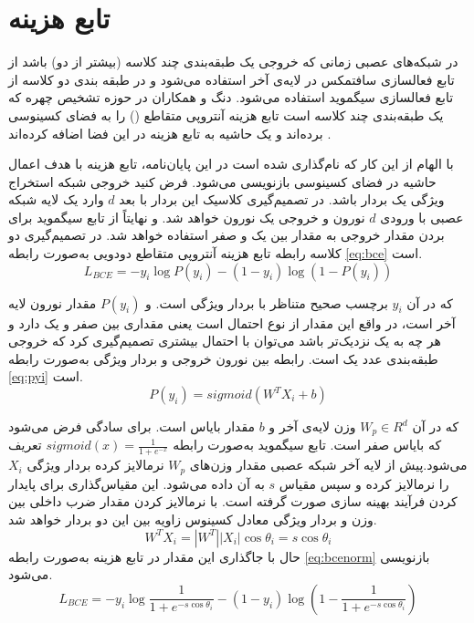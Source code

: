 \section{تابع هزینه }
در شبکه‌های عصبی زمانی که خروجی یک طبقه‌بندی چند کلاسه (بیشتر از دو) باشد از تابع فعالسازی سافتمکس
 در لایه‌ی آخر استفاده می‌شود و در طبقه بندی دو کلاسه از تابع فعالسازی سیگموید 
 استفاده می‌شود. دنگ و همکاران در حوزه تشخیص چهره
  که یک طبقه‌بندی چند کلاسه است تابع هزینه آنتروپی متقاطع
   () را به فضای کسینوسی برده‌اند و یک حاشیه به تابع هزینه در این فضا اضافه کرده‌اند
\cite{deng2019arcface}.

با الهام از این کار که  نام‌گذاری شده است در این پایان‌نامه، تابع هزینه  با هدف اعمال حاشیه در فضای کسینوسی بازنویسی می‌شود. فرض کنید خروجی شبکه استخراج ویژگی یک بردار  باشد. در تصمیم‌گیری کلاسیک این بردار با بعد $d$ وارد یک لایه شبکه عصبی با ورودی $d$ نورون و خروجی یک نورون خواهد شد. و نهایتاً از تابع سیگموید برای بردن مقدار خروجی به مقدار بین یک و صفر استفاده خواهد شد.
در تصمیم‌گیری دو کلاسه رابطه تابع هزینه آنتروپی متقاطع دودویی به‌صورت رابطه
\ref{eq:bce}
است.
\begin{equation}\label{eq:bce}
	L_{BCE} = -y_i \log{P(y_i)} - (1-y_i)\log{( 1-P(y_i) )}
\end{equation}

 که در آن 
$y_i$
  برچسب صحیح متناظر با بردار ویژگی   است. و 
$P(y_i)$
   مقدار نورون لایه آخر است، در واقع این مقدار از نوع احتمال است یعنی مقداری بین صفر و یک دارد و هر چه به یک نزدیک‌تر باشد می‌توان با احتمال بیشتری تصمیم‌گیری کرد که خروجی طبقه‌بندی عدد یک است.
رابطه بین نورون خروجی و بردار ویژگی   به‌صورت رابطه
\ref{eq:pyi}
است.
\begin{equation}\label{eq:pyi}
	P(y_i) = sigmoid(W^TX_i+b)
\end{equation}

که در آن  
$W_p \in R^d$
وزن لایه‌ی آخر و $b$ مقدار بایاس است. برای سادگی فرض می‌شود که بایاس صفر است.  تابع سیگموید به‌صورت رابطه
$sigmoid(x) = \frac{1}{1+e^{-x}}$
 تعریف می‌شود.پیش از لایه آخر شبکه عصبی مقدار وزن‌های 
$W_p$
 نرمالایز کرده بردار ویژگی 
 $X_i$
  را نرمالایز کرده و سپس مقیاس $s$ به آن داده می‌شود. این مقیاس‌گذاری برای پایدار کردن فرآیند بهینه سازی صورت گرفته است.
  با نرمالایز کردن مقدار ضرب داخلی بین وزن و بردار ویژگی معادل کسینوس زاویه بین این دو بردار خواهد شد.
 \begin{equation}\label{eq:wti}
	W^TX_i = |W^T||X_i| \cos{\theta_i}=s\cos{\theta_i}
 \end{equation}
حال با جاگذاری این مقدار در تابع هزینه  به‌صورت رابطه
\ref{eq:bcenorm}
 بازنویسی می‌شود.
\begin{equation}\label{eq:bcenorm}
	L_{BCE} = -y_i \log{\frac{1}{1+e^{-s\cos{\theta_i}}}} - (1-y_i)\log{(1-\frac{1}{1+e^{-s\cos{\theta_i}}} )}
\end{equation}

